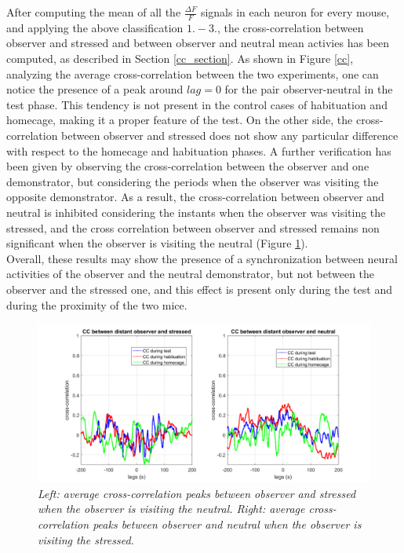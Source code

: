 \documentclass[12pt, a4paper]{report}
\begin{document}
After computing the mean of all the $\frac{\Delta F}{F}$ signals in each neuron for every mouse, and applying the above classification $1.-3.$, the cross-correlation between observer and stressed and between observer and neutral mean activies has been computed, as described in Section \ref{cc_section}. As shown in Figure \ref{cc}, analyzing the average cross-correlation between the two experiments, one can notice the presence of a peak around $ lag=0 $ for the pair observer-neutral in the test phase. This tendency is not present in the control cases of habituation and homecage, making it a proper feature of the test. On the other side, the cross-correlation between observer and stressed does not show any particular difference with respect to the homecage and habituation phases. A further verification has been given by observing the cross-correlation between the observer and one demonstrator, but considering the periods when the observer was visiting the opposite demonstrator. As a result, the cross-correlation between observer and neutral is inhibited considering the instants when the observer was visiting the stressed, and the cross correlation between observer and stressed remains non significant when the observer is visiting the neutral (Figure \ref{distant}).\\
 Overall, these results may show the presence of a synchronization between neural activities of the observer and the neutral demonstrator, but not between the observer and the stressed one, and this effect is present only during the test and during the proximity of the two mice.

\begin{figure}[H]
	
	\begin{center}
		\hspace*{-1.4cm}
		\includegraphics[scale=.5]{cc_distant.png} 
	\end{center} 
	\caption{\textit{Left: average cross-correlation peaks between observer and stressed when the observer is visiting the neutral. Right: average cross-correlation peaks between observer and neutral when the observer is visiting the stressed.}} \label{distant}
	
\end{figure}
\end{document}
